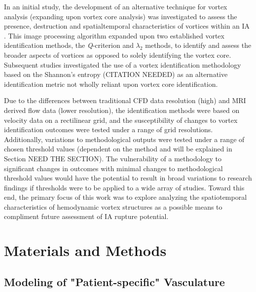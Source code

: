 In an initial study, the development of an alternative technique for vortex analysis (expanding upon vortex core analysis) was investigated to assess the presence, destruction and spatialtemporal characteristics of vortices within an IA \cite{sunderland2016vortex}. This image processing algorithm expanded upon two established vortex identification methods, the \textit{Q}-criterion \cite{hunt1988eddies} and $\lambda_2$ \cite{jeong1995identification} methods, to identify and assess the broader aspects of vortices as opposed to solely identifying the vortex core. Subsequent studies investigated the use of a vortex identification methodology based on the Shannon's entropy (CITATION NEEDED) as an alternative identification metric not wholly reliant upon vortex core identification. 

Due to the differences between traditional CFD data resolution (high) and MRI derived flow data (lower resolution), the identification methods were based on velocity data on a rectilinear grid, and the susceptibility of changes to vortex identification outcomes were tested under a range of grid resolutions. Additionally, variations to methodological outputs were tested under a range of chosen threshold values (dependent on the method and will be explained in Section NEED THE SECTION). The vulnerability of a methodology to significant changes in outcomes with minimal changes to methodological threshold values would have the potential to result in broad variations to research findings if thresholds were to be applied to a wide array of studies. Toward this end, the primary focus of this work was to explore analyzing the spatiotemporal characteristics of hemodynamic vortex structures as a possible means to compliment future assessment of IA rupture potential.  

\section{Materials and Methods}\label{CHAPTER3_SECTION1}
\subsection{Modeling of "Patient-specific" Vasculature}\label{CHAPTER3_SECTION1_SUBSECTION1}

